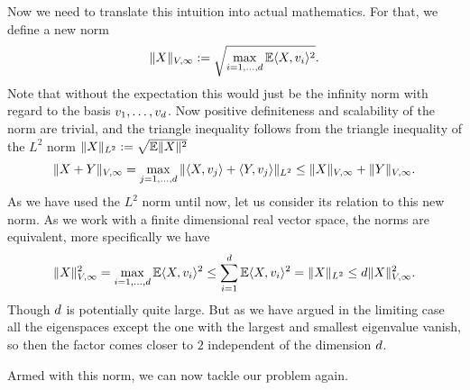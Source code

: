 Now we need to translate this intuition into actual mathematics. For that, we
define a new norm
\begin{align}
	\|X\|_{V,\infty}
	:= \sqrt{\max_{i=1,\dots,d} \mathbb{E}\langle X, v_i\rangle^2}.
\end{align}
Note that without the expectation this would just be the infinity norm with regard
to the basis \(v_1,\dots,v_d\). Now positive definiteness and
scalability of the norm are trivial, and the triangle inequality follows from the
triangle inequality of the \(L^2\) norm \(\|X\|_{L^2} := \sqrt{\mathbb{E}\|X\|^2}\)
\begin{align*}
	\|X+Y\|_{V,\infty}
	= \max_{j=1,\dots,d} \|\langle X, v_j\rangle + \langle Y, v_j\rangle\|_{L^2}
	\le \|X\|_{V,\infty} + \|Y\|_{V,\infty}.
\end{align*}
As we have used the \(L^2\) norm until now, let us consider its relation
to this new norm. As we work with a finite dimensional real vector space, the
norms are equivalent, more specifically we have
\begin{align*}
	\|X\|_{V,\infty}^2
	= \max_{i=1,\dots,d} \mathbb{E}\langle X, v_i\rangle^2
	\le \sum_{i=1}^d \mathbb{E}\langle X, v_i\rangle^2
	= \|X\|_{L^2}
	\le d \|X\|_{V,\infty}^2.
\end{align*}
Though \(d\) is potentially quite large. But as we have argued in the
limiting case all the eigenspaces except the one with the largest and smallest
eigenvalue vanish, so then the factor comes closer to \(2\) independent of the
dimension \(d\).

Armed with this norm, we can now tackle our problem again.

